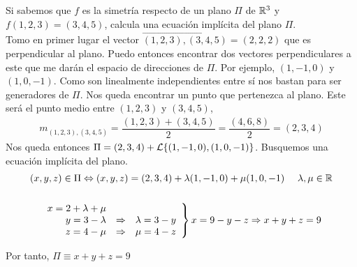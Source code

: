 \documentclass[12pt]{article}
\begin{document}
    \begin{ejercicio}[2 puntos]
        Si sabemos que $f$ es la simetría respecto de un plano $\Pi$ de $\mathbb{R}^3$ y $f(1,2,3)=(3,4,5)$, calcula una ecuación implícita del plano $\Pi$.\\

        Tomo en primer lugar el vector $\vec{(1,2,3),(3,4,5)}=(2,2,2)$ que es perpendicular al plano.
        Puedo entonces encontrar dos vectores perpendiculares a este que me darán el espacio de direcciones de $\Pi$.
        Por ejemplo, $(1,-1,0)$ y $(1,0,-1)$. Como son linealmente independientes entre sí nos bastan para ser generadores de $\Pi$.
        Nos queda encontrar un punto que pertenezca al plano. Este será el punto medio entre $(1,2,3)$ y $(3,4,5)$,
        \begin{gather*}
            m_{(1,2,3),(3,4,5)}=\dfrac{(1,2,3)+(3,4,5)}{2} = \dfrac{(4,6,8)}{2} = (2,3,4) %
        \end{gather*}
        Nos queda entonces $\Pi=(2,3,4)+\mathcal{L}\{(1,-1,0),(1,0,-1)\}$. Busquemos una ecuación implícita del plano.\\
        \begin{gather*}
            (x,y,z)\in \Pi \Leftrightarrow (x,y,z)=(2,3,4)+\lambda(1,-1,0)+\mu (1,0,-1)\ \ \ \ \lambda,\mu \in \mathbb{R}\\\\
            \left.\begin{array}{r c l}
                x=2+\lambda + \mu&&\\
                y=3-\lambda &\Rightarrow & \lambda = 3-y\\
                z=4-\mu &\Rightarrow & \mu = 4-z\\
            \end{array}\right\} x = 9 -y-z \Rightarrow x+y+z=9
        \end{gather*}

        Por tanto, $\Pi \equiv x+y+z=9$
    \end{ejercicio}
     
\end{document}
